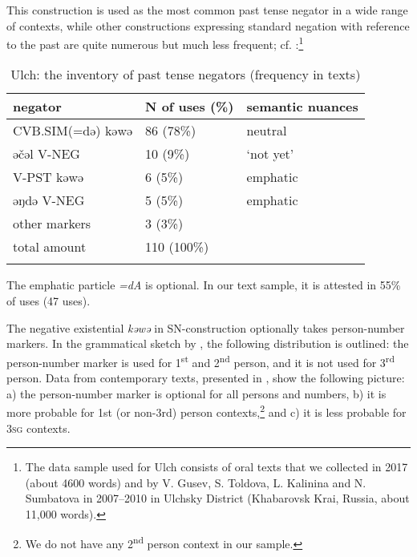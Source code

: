\documentclass[output=paper]{langscibook}
\begin{document}
This construction is used as the most common past tense negator in a wide range of contexts, while other constructions expressing standard negation with reference to the past are quite numerous but much less frequent; cf. :\footnote{The data sample used for Ulch consists of oral texts that we collected in 2017 (about 4600 words) and by V. Gusev, S. Toldova, L. Kalinina and N. Sumbatova in 2007–2010 in Ulchsky District (Khabarovsk Krai, Russia, about 11,000 words).}

\begin{table}
    \caption{Ulch: the inventory of past tense negators (frequency in texts)}
    \label{tab:T5}
    \begin{tabular}{lll}
    \lsptoprule
    negator & N of uses (\%) & semantic nuances \\ \midrule
    \rowcolor[HTML]{EFEFEF} 
    CVB.SIM(=də) kəwə & 86 (78\%) & neutral \\
    əčəl V-NEG & 10 (9\%) & ‘not yet’ \\
    V-PST kəwə & 6 (5\%) & emphatic \\
    əŋdə V-NEG & 5 (5\%) & emphatic \\
    other markers & 3 (3\%) &  \\ \midrule
    total amount & 110 (100\%) &  \\ \lspbottomrule
    \end{tabular}
\end{table}


The emphatic particle \textit{=dA} is optional. In our text sample, it is attested in 55\% of uses (47 uses).

The negative existential \textit{kəwə} in SN-construction optionally takes person-number markers. In the grammatical sketch by \citet[65]{petrova1936a}, the following distribution is outlined: the person-number marker is used for 1\textsuperscript{st} and 2\textsuperscript{nd} person, and it is not used for 3\textsuperscript{rd} person. Data from contemporary texts, presented in , show the following picture: a) the person-number marker is optional for all persons and numbers, b) it is more probable for 1st (or non-3rd) person contexts,\footnote{We do not have any 2\textsuperscript{nd} person context in our sample.} and c) it is less probable for \textsc{3sg} contexts.
\end{document}
